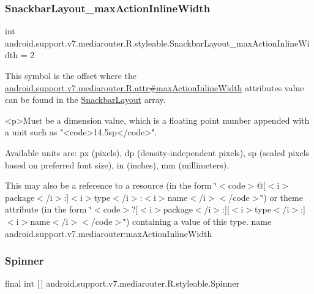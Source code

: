 \subsubsection{\texorpdfstring{Snackbar\+Layout\+\_\+max\+Action\+Inline\+Width}{SnackbarLayout\_maxActionInlineWidth}}
{\footnotesize\ttfamily int android.\+support.\+v7.\+mediarouter.\+R.\+styleable.\+Snackbar\+Layout\+\_\+max\+Action\+Inline\+Width = 2\hspace{0.3cm}{\ttfamily [static]}}

This symbol is the offset where the \hyperlink{classandroid_1_1support_1_1v7_1_1mediarouter_1_1R_1_1attr_aa93a1e8f467b0b783c9a9b2ec3ad6159}{android.\+support.\+v7.\+mediarouter.\+R.\+attr\#max\+Action\+Inline\+Width} attribute\textquotesingle{}s value can be found in the \hyperlink{classandroid_1_1support_1_1v7_1_1mediarouter_1_1R_1_1styleable_a1653efd198ae58b5c9d976b12d23f9a7}{Snackbar\+Layout} array.

\begin{DoxyVerb}      <p>Must be a dimension value, which is a floating point number appended with a unit such as "<code>14.5sp</code>".
\end{DoxyVerb}
 Available units are\+: px (pixels), dp (density-\/independent pixels), sp (scaled pixels based on preferred font size), in (inches), mm (millimeters). 

This may also be a reference to a resource (in the form \char`\"{}$<$code$>$@\mbox{[}$<$i$>$package$<$/i$>$\+:\mbox{]}$<$i$>$type$<$/i$>$\+:$<$i$>$name$<$/i$>$$<$/code$>$\char`\"{}) or theme attribute (in the form \char`\"{}$<$code$>$?\mbox{[}$<$i$>$package$<$/i$>$\+:\mbox{]}\mbox{[}$<$i$>$type$<$/i$>$\+:\mbox{]}$<$i$>$name$<$/i$>$$<$/code$>$\char`\"{}) containing a value of this type.  name android.\+support.\+v7.\+mediarouter\+:max\+Action\+Inline\+Width \mbox{\label{classandroid_1_1support_1_1v7_1_1mediarouter_1_1R_1_1styleable_adb75721ed5a18e76fcd9c38619ce0ac5}} 
\subsubsection{\texorpdfstring{Spinner}{Spinner}}
{\footnotesize\ttfamily final int \mbox{[}$\,$\mbox{]} android.\+support.\+v7.\+mediarouter.\+R.\+styleable.\+Spinner\hspace{0.3cm}{\ttfamily [static]}}

